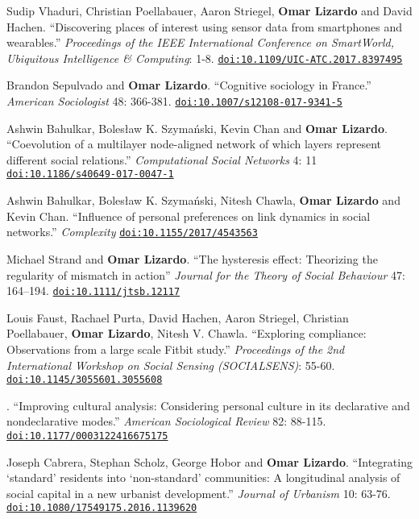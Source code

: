 
\ind Sudip Vhaduri, Christian Poellabauer, Aaron Striegel, {\bf Omar Lizardo} and David Hachen. ``Discovering places of interest using sensor data from smartphones and wearables.'' {\em Proceedings of the IEEE International Conference on SmartWorld, Ubiquitous Intelligence \& Computing}: 1-8. \href{https://doi.org/10.1109/UIC-ATC.2017.8397495}{\nolinkurl{doi:10.1109/UIC-ATC.2017.8397495}}

\ind Brandon Sepulvado and {\bf Omar Lizardo}. ``Cognitive sociology in France.'' {\em American Sociologist} 48: 366-381. 
\href{https://doi.org/10.1007/s12108-017-9341-5}{\nolinkurl{doi:10.1007/s12108-017-9341-5}}

\ind Ashwin Bahulkar, Boles\l{}aw K. Szyma\'{n}ski, Kevin Chan and {\bf Omar Lizardo}. ``Coevolution of a multilayer node-aligned network of which layers represent different social relations.'' {\em Computational Social Networks} 4: 11 \href{https://doi.org/10.1186/s40649-017-0047-1}{\nolinkurl{doi:10.1186/s40649-017-0047-1}} 

\ind Ashwin Bahulkar, Boles\l{}aw K. Szyma\'{n}ski, Nitesh Chawla, {\bf Omar Lizardo} and Kevin Chan. ``Influence of personal preferences on link dynamics in social networks.'' {\em Complexity} \href{https://doi.org/10.1155/2017/4543563}{\nolinkurl{doi:10.1155/2017/4543563}}

\ind Michael Strand and {\bf Omar Lizardo}. ``The hysteresis effect: Theorizing the regularity of mismatch in action'' {\em Journal for the Theory of Social Behaviour} 47: 164–194. \href{https://doi.org/10.1111/jtsb.12117}{\nolinkurl{doi:10.1111/jtsb.12117}}

\ind Louis Faust, Rachael Purta, David Hachen, Aaron Striegel, Christian Poellabauer, {\bf Omar Lizardo}, Nitesh V. Chawla. ``Exploring compliance: Observations from a large scale Fitbit study.'' {\em Proceedings of the 2nd International Workshop on Social Sensing (SOCIALSENS)}: 55-60. \href{https://doi.org/10.1145/3055601.3055608}{\nolinkurl{doi:10.1145/3055601.3055608}}

. ``Improving cultural analysis: Considering personal culture in its declarative and nondeclarative modes.'' {\em American Sociological Review} 82: 88-115. \href{https://doi.org/10.1177/0003122416675175}{\nolinkurl{doi:10.1177/0003122416675175}} 

\ind Joseph Cabrera, Stephan Scholz, George Hobor and {\bf Omar Lizardo}. ``Integrating `standard' residents into `non-standard' communities: A longitudinal analysis of social capital in a new urbanist development.''  {\em Journal of Urbanism} 10: 63-76. \href{https://doi.org/10.1080/17549175.2016.1139620}{\nolinkurl{doi:10.1080/17549175.2016.1139620}}
